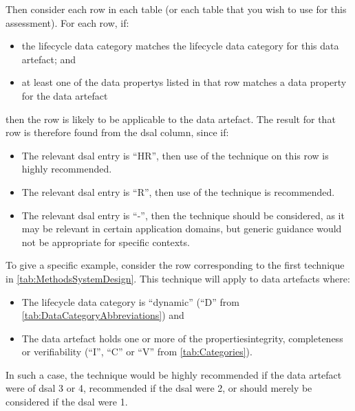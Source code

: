 Then consider each row in each table (or each table that you wish to use for this assessment). For each row, if:
\begin{itemize}
    \item the lifecycle data category matches the lifecycle data category for this \gls{data artefact}; and
    \item at least one of the \glspl{data property} listed in that row matches a \gls{data property} for the \gls{data artefact} 
\end{itemize}
then the row is likely to be applicable to the \gls{data artefact}. The result for that row is therefore found from the \gls{dsal} column, since if:
\begin{itemize}
    \item The relevant \gls{dsal} entry is ``HR'', then use of the technique on this row is highly recommended.
    \item The relevant \gls{dsal} entry is ``R'', then use of the technique is recommended.
    \item The relevant \gls{dsal} entry is ``-'', then the technique should be considered, as it may be relevant in certain application domains, but  generic guidance would not be appropriate for specific contexts.
\end{itemize}

To give a specific example, consider the row corresponding to the first technique in \autoref{tab:MethodsSystemDesign}. This technique will apply to \glspl{data artefact} where:
\begin{itemize}
    \item The lifecycle data category is ``dynamic'' (``D'' from \autoref{tab:DataCategoryAbbreviations}) and
    \item The \gls{data artefact} holds one or more of the properties\gls{integrity}, \gls{completeness} or \gls{verifiability} (``I'', ``C'' or ``V'' from \autoref{tab:Categories}).
\end{itemize}
In such a case, the technique would be highly recommended if the \gls{data artefact} were of \gls{dsal} 3 or 4, recommended if the \gls{dsal} were 2, or should merely be considered if the \gls{dsal} were 1.

